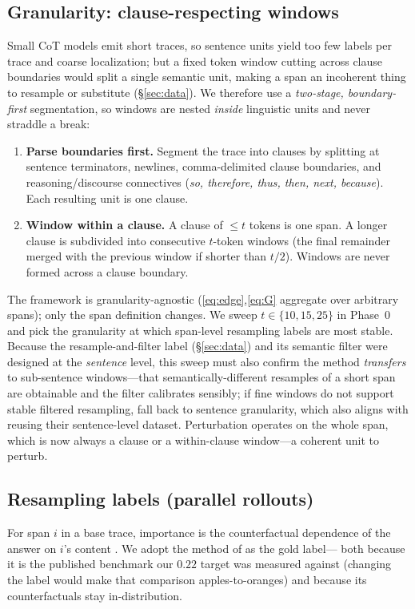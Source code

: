 \documentclass[11pt]{article}
\begin{document}
\subsection{Granularity: clause-respecting windows}
\label{sec:granularity}
Small CoT models emit short traces, so sentence units yield too few labels per trace and coarse
localization; but a fixed token window cutting across clause boundaries would split a single semantic
unit, making a span an incoherent thing to resample or substitute (\S\ref{sec:data}). We therefore use a
\emph{two-stage, boundary-first} segmentation, so windows are nested \emph{inside} linguistic units and
never straddle a break:
\begin{enumerate}[leftmargin=1.6em,itemsep=2pt]
\item \textbf{Parse boundaries first.} Segment the trace into clauses by splitting at sentence
terminators, newlines, comma-delimited clause boundaries, and reasoning/discourse connectives
(\textit{so, therefore, thus, then, next, because}). Each resulting unit is one clause.
\item \textbf{Window within a clause.} A clause of $\le t$ tokens is one span. A longer clause is
subdivided into consecutive $t$-token windows (the final remainder merged with the previous window if
shorter than $t/2$). Windows are never formed across a clause boundary.
\end{enumerate}
The framework is granularity-agnostic (\eqref{eq:edge},\eqref{eq:G} aggregate over arbitrary spans);
only the span definition changes. We sweep $t\in\{10,15,25\}$ in Phase~0 and pick the granularity at
which span-level resampling labels are most stable. Because the resample-and-filter label
(\S\ref{sec:data}) and its semantic filter were designed at the \emph{sentence} level, this sweep must
also confirm the method \emph{transfers} to sub-sentence windows---that semantically-different
resamples of a short span are obtainable and the filter calibrates sensibly; if fine windows do not
support stable filtered resampling, fall back to sentence granularity, which also aligns with reusing
their sentence-level dataset. Perturbation operates on the whole span, which is
now always a clause or a within-clause window---a coherent unit to perturb.

\subsection{Resampling labels (parallel rollouts)}
For span $i$ in a base trace, importance is the counterfactual dependence of the answer on $i$'s
content \cite{bogdan2025thought}. We adopt the method of \cite{bogdan2025thought} as the gold label---
both because it is the published benchmark our $0.22$ target was measured against (changing the label
would make that comparison apples-to-oranges) and because its counterfactuals stay in-distribution.
\end{document}
